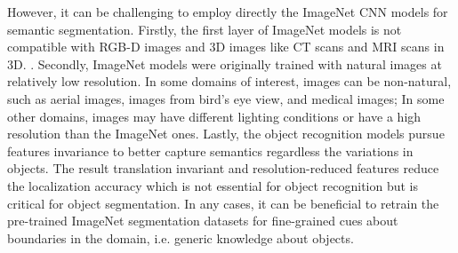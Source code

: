 However, it can be challenging to employ directly the ImageNet CNN models for semantic segmentation.
Firstly, the first layer of ImageNet models is not compatible with RGB-D images and 3D images like CT scans and MRI scans in 3D.
\cite{zheng2015conditional}.
Secondly, ImageNet models were originally trained with natural images at relatively low resolution.
In some domains of interest, images can be non-natural, such as aerial images, images from bird's eye view, and medical images;
In some other domains, images may have different lighting conditions or have a high resolution than the ImageNet ones.
Lastly, the object recognition models pursue features invariance to better capture semantics regardless the variations in objects.
The result translation invariant and resolution-reduced features reduce the localization accuracy which is not essential for object recognition but is critical for object segmentation. \cite{zheng2015conditional,chen2016deeplab}
In any cases, it can be beneficial to retrain the pre-trained ImageNet segmentation datasets for fine-grained cues about boundaries in the domain, i.e. generic knowledge about objects.






